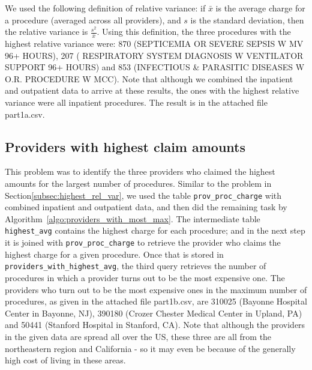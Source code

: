 We used the following definition of relative variance: if $\bar{x}$ is the average charge for a procedure (averaged across all providers), and $s$ is the standard deviation, then the relative variance is $\frac{s^2}{\bar{x}}$. Using this definition, the three procedures with the highest relative variance were: 870 (SEPTICEMIA OR SEVERE SEPSIS W MV 96+ HOURS), 207 ( RESPIRATORY SYSTEM DIAGNOSIS W VENTILATOR SUPPORT 96+ HOURS) and 853 (INFECTIOUS \& PARASITIC DISEASES W O.R. PROCEDURE W MCC). Note that although we combined the inpatient and outpatient data to arrive at these results, the ones with the highest relative variance were all inpatient procedures. The result is in the attached file part1a.csv.


\subsection{Providers with highest claim amounts}
\label{subsec:providers_with_most_max}
This problem was to identify the three providers who claimed the highest amounts for the largest number of procedures. Similar to the problem in Section\ref{subsec:highest_rel_var}, we used the table \texttt{prov\_proc\_charge} with combined inpatient and outpatient data, and then did the remaining task by Algorithm~\ref{algo:providers_with_most_max}. The intermediate table \texttt{highest\_avg} contains the highest charge for each procedure; and in the next step it is joined with \texttt{prov\_proc\_charge} to retrieve the provider who claims the highest charge for a given procedure. Once that is stored in \texttt{providers\_with\_highest\_avg}, the third query retrieves the number of procedures in which a provider turns out to be the most expensive one. The providers who turn out to be the most expensive ones in the maximum number of procedures, as given in the attached file part1b.csv, are 310025 (Bayonne Hospital Center in Bayonne, NJ), 390180 (Crozer Chester Medical Center in Upland, PA) and 50441 (Stanford Hospital in Stanford, CA). Note that although the providers in the given data are spread all over the US, these three are all from the northeastern region and California - so it may even be because of the generally high cost of living in these areas. 

